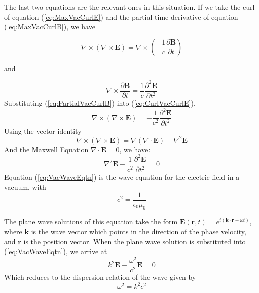 \documentclass[twocolumn]{article}
\begin{document}
The last two equations are the relevant ones in this situation.
If we take the curl of equation (\ref{eq:MaxVacCurlE}) and the partial time derivative of equation (\ref{eq:MaxVacCurlB}), we have

\begin{equation}
	\label{eq:CurlVacCurlE}
	\nabla \times ( \nabla \times \mathbf{E}) = \nabla \times (-\frac{1}{c} \frac{\partial \mathbf{B}}{\partial t}) 
\end{equation}
\begin{center}
	and
\end{center}
\begin{equation}
	\label{eq:PartialVacCurlB}
	\nabla \times \frac{\partial \mathbf{B}}{\partial t} = \frac{1}{c} \frac{\partial^2 \mathbf{E}}{\partial t^2}
\end{equation}
Substituting (\ref{eq:PartialVacCurlB}) into (\ref{eq:CurlVacCurlE}),
\begin{equation}
	\nabla \times ( \nabla \times \mathbf{E}) = -\frac{1}{c^2} \frac{\partial^2 \mathbf{E}}{\partial t^2} 
\end{equation}
Using the vector identity
\begin{equation}
	\label{eq:NablaIdent}
	\nabla \times (\nabla \times \mathbf{E}) = \nabla(\nabla \cdot \mathbf{E}) - \nabla^2\mathbf{E}
\end{equation}
And the Maxwell Equation $\nabla \cdot \mathbf{E} = 0$, we have:
\begin{equation}
	\label{eq:VacWaveEqtn}
	\nabla^2\mathbf{E} - \frac{1}{c^2} \frac{\partial^2 \mathbf{E}}{\partial t^2} = 0
\end{equation}
Equation (\ref{eq:VacWaveEqtn}) is the wave equation for the electric field in a vacuum, with
\begin{equation}
	c^2 = \frac{1}{\epsilon_0 \mu_0}
\end{equation}

The plane wave solutions of this equation take the form $\mathbf{E}(\mathbf{r}, t) = e^{i(\mathbf{k} \cdot \mathbf{r} - \omega t)}$, where $\mathbf{k}$ is the wave vector which points in the direction of the phase velocity, and $\mathbf{r}$ is the position vector.
When the plane wave solution is substituted into (\ref{eq:VacWaveEqtn}), we arrive at
\begin{equation}
	k^2\mathbf{E} - \frac{\omega^2}{c^2}\mathbf{E} = 0
\end{equation}
Which reduces to the dispersion relation of the wave given by
\begin{equation}
	\omega^2 = k^2c^2
\end{equation}
\end{document}
